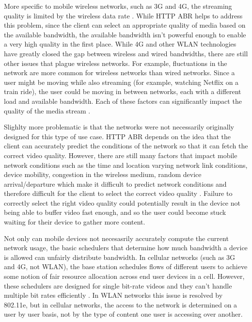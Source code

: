 \documentclass[12pt]{article}
\begin{document}
More specific to mobile wireless networks, such as 3G and 4G, the streaming quality is limited by the wireless data rate \cite{wireless_stream_challenges}.  While HTTP ABR helps to address this problem, since the client can select an appropriate quality of media based on the available bandwidth, the available bandwidth isn't powerful enough to enable a very high quality in the first place.  While 4G and other WLAN technologies have greatly closed the gap between wireless and wired bandwidths, there are still other issues that plague wireless networks.  For example, fluctuations in the network are more common for wireless networks than wired networks.  Since a user might be moving while also streaming (for example, watching Netflix on a train ride), the user could be moving in between networks, each with a different load and available bandwidth.  Each of these factors can significantly impact the quality of the media stream \cite{wireless_stream_challenges}.

Slighlty more problematic is that the networks were not necessarily originally designed for this type of use case.  HTTP ABR depends on the idea that the client can accurately predict the conditions of the network so that it can fetch the correct video quality.  However, there are still many factors that impact mobile network conditions such as the time and location varying network link conditions, device mobility, congestion in the wireless medium, random device arrival/departure which make it difficult to predict network conditions and therefore difficult for the client to select the correct video quality \cite{10287427420150501}.  Failure to correctly select the right video quality could potentially result in the device not being able to buffer video fast enough, and so the user could become stuck waiting for their device to gather more content.

Not only can mobile devices not necesasrily accurately compute the current network usage, the basic schedulers that determine how much bandwidth a device is allowed can unfairly distribute bandwidth.  In cellular networks (such as 3G and 4G, not WLAN), the base station schedules flows of different users to achieve some notion of fair resource allocation across end user devices in a cell. However, these schedulers are designed for single bit-rate videos and they can’t handle multiple bit rates efficiently \cite{10287427420150501}.  In WLAN networks this issue is resolved by 802.11e, but in cellular networks, the access to the network is determined on a user by user basis, not by the type of content one user is accessing over another.
\end{document}
